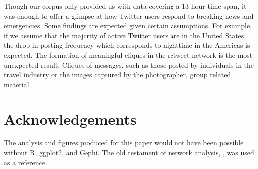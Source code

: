 \documentclass[a4paper, 11pt, titlepage]{article}
\begin{document}



Though our corpus only provided us with data covering a 13-hour time span, it was enough to offer a glimpse at how Twitter users respond to breaking news and emergencies.  Some findings are expected given certain assumptions.  For example, if we assume that the majority of active Twitter users are in the United States, the drop in posting frequency which corresponds to nighttime in the Americas is expected.  The formation of meaningful cliques in the retweet network is the most unexpected result.  Cliques of messages, such as those posted by individuals in the travel industry or the images captured by the photographer, group related material

\section{Acknowledgements}

The analysis and figures produced for this paper would not have been possible without R\cite{R}, ggplot2\cite{wickham2008ggplot2, wickham2009ggplot2}, and Gephi\cite{bastian2009gephi}.
The old testament of network analysis, \cite{wasserman1994sna}, was used as a reference.



\end{document}
